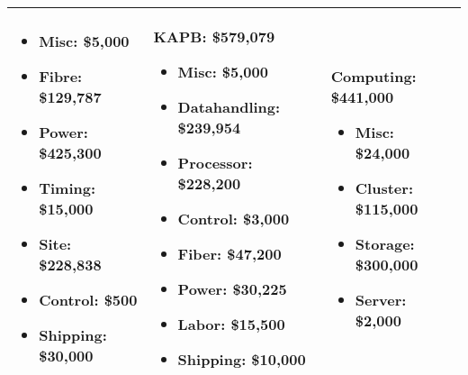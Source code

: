 \begin{table}[ht]
\begin{tabular}{| p{2in} | p{2in} | p{2in} | }
\vspace{-.1in}
\begin{itemize}[parsep=-2pt, itemsep=-3pt]
\item Misc:   \$5,000
\item Fibre:   \$129,787
\item Power:   \$425,300
\item Timing:   \$15,000
\item Site:   \$228,838
\item Control:   \$500
\item Shipping:   \$30,000
\end{itemize}
 &
\noindent
\textbf{KAPB:}  \$579,079
\vspace{-.1in}
\begin{itemize}[parsep=-2pt, itemsep=-3pt]
\item Misc:   \$5,000
\item Datahandling:   \$239,954
\item Processor:   \$228,200
\item Control:   \$3,000
\item Fiber:   \$47,200
\item Power:   \$30,225
\item Labor:   \$15,500
\item Shipping:   \$10,000
\vspace{-.1in}
\end{itemize}
 &
\noindent
\textbf{Computing:}  \$441,000
\vspace{-.1in}
\begin{itemize}[parsep=-2pt, itemsep=-3pt]
\item Misc:   \$24,000
\item Cluster:   \$115,000
\item Storage:   \$300,000
\item Server:   \$2,000
\end{itemize}
\\ \hline
\end{tabular}
\end{table}


